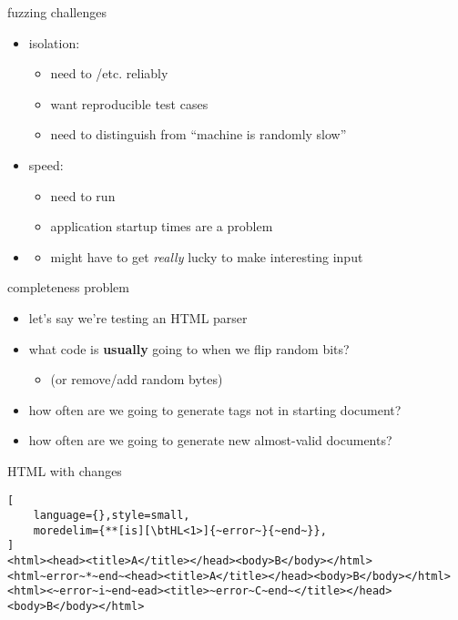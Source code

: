 \begin{frame}{fuzzing challenges}
    \begin{itemize}
    \item isolation:
        \begin{itemize}
        \item need to /etc. reliably
        \item want reproducible test cases
        \item need to distinguish  from ``machine is randomly slow''
        \end{itemize}
    \item speed:
        \begin{itemize}
            \item need to run 
        \item application startup times are a problem
        \end{itemize}
    \item \textbf<2>{}
        \begin{itemize}
            \item might have to get \textit{really} lucky to make interesting input
        \end{itemize}
    \end{itemize}
\end{frame}
\begin{frame}{completeness problem}
    \begin{itemize}
        \item let's say we're testing an HTML parser
        \item what code is \textbf{usually} going to when we flip random bits?
            \begin{itemize} 
                \item (or remove/add random bytes)
            \end{itemize}
        \vspace{.5cm}
        \item<2> how often are we going to generate tags not in starting document?
        \item<2> how often are we going to generate new almost-valid documents?
    \end{itemize}
\end{frame}

\begin{frame}[fragile,label=HTMLchanges]{HTML with changes}
\begin{lstlisting}[
    language={},style=small,
    moredelim={**[is][\btHL<1>]{~error~}{~end~}},
]
<html><head><title>A</title></head><body>B</body></html>
<html~error~*~end~<head><title>A</title></head><body>B</body></html>
<html><~error~i~end~ead><title>~error~C~end~</title></head><body>B</body></html>
\end{lstlisting}
\end{frame}


